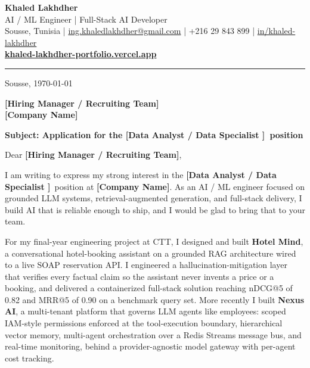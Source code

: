 \documentclass[11pt,a4paper]{article}
\newcommand{\FILL}[1]{{\bfseries\color{accent}#1}}
\newcommand{\Role}{\FILL{[Data Analyst / Data Specialist ]}}
\newcommand{\Company}{\FILL{[Company Name]}}
\newcommand{\Manager}{\FILL{[Hiring Manager / Recruiting Team]}}
\begin{document}
\begin{center}
  {\LARGE\bfseries\color{accent} Khaled Lakhdher}\\[2pt]
  {\large\color{muted} AI / ML Engineer \;|\; Full-Stack AI Developer}\\[4pt]
  {\small\color{muted}
    Sousse, Tunisia \quad|\quad
    \href{mailto:ing.khaledlakhdher@gmail.com}{ing.khaledlakhdher@gmail.com} \quad|\quad
    +216 29 843 899 \quad|\quad
    \href{https://www.linkedin.com/in/khaled-lakhdher}{in/khaled-lakhdher}
  }\\[2pt]
  {\small\href{https://khaled-lakhdher-portfolio.vercel.app}{\textbf{\color{accent}khaled-lakhdher-portfolio.vercel.app}}}
\end{center}

\vspace{4pt}
{\color{muted!40}\hrule}
\vspace{10pt}

\hfill Sousse, \today

\Manager\\
\Company

\vspace{4pt}
\textbf{Subject: Application for the \Role\ position}

\vspace{6pt}
Dear \Manager,

I am writing to express my strong interest in the \Role\ position at \Company. As an AI / ML engineer focused on grounded LLM systems, retrieval-augmented generation, and full-stack delivery, I build AI that is reliable enough to ship, and I would be glad to bring that to your team.

For my final-year engineering project at CTT, I designed and built \textbf{Hotel Mind}, a conversational hotel-booking assistant on a grounded RAG architecture wired to a live SOAP reservation API. I engineered a hallucination-mitigation layer that verifies every factual claim so the assistant never invents a price or a booking, and delivered a containerized full-stack solution reaching nDCG@5 of 0.82 and MRR@5 of 0.90 on a benchmark query set. More recently I built \textbf{Nexus AI}, a multi-tenant platform that governs LLM agents like employees: scoped IAM-style permissions enforced at the tool-execution boundary, hierarchical vector memory, multi-agent orchestration over a Redis Streams message bus, and real-time monitoring, behind a provider-agnostic model gateway with per-agent cost tracking.
\end{document}
